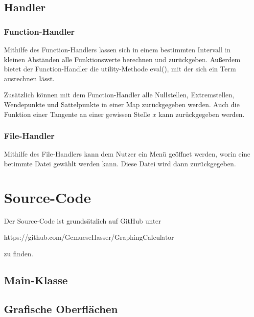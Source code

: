 \documentclass[12pt,a4paper]{article}
\newcommand{\project}{/home/jonas/Dokumente/Java-Projekte/GraphingCalculator/src/main/java/de/jonas/graphingcalculator}
\begin{document}
    \subsection{Handler}

    \subsubsection{Function-Handler}
    Mithilfe des Function-Handlers lassen sich in einem bestimmten Intervall in kleinen Abständen alle
    Funktionswerte berechnen und zurückgeben.
    Außerdem bietet der Function-Handler die utility-Methode eval(), mit der sich ein Term ausrechnen lässt.\par
    Zusätzlich können mit dem Function-Handler alle Nullstellen, Extremstellen, Wendepunkte und Sattelpunkte
    in einer Map zurückgegeben werden.
    Auch die Funktion einer Tangente an einer gewissen Stelle $x$ kann zurückgegeben werden.

    \subsubsection{File-Handler}
    Mithilfe des File-Handlers kann dem Nutzer ein Menü geöffnet werden, worin eine betimmte Datei gewählt werden kann.
    Diese Datei wird dann zurückgegeben.

    \newpage


    \section{Source-Code}
    Der Source-Code ist grundsätzlich auf GitHub unter\par
    https://github.com/GemueseHasser/GraphingCalculator\par
    zu finden.

    \vspace{1cm}

    \subsection{Main-Klasse}

    

    \newpage
    \subsection{Grafische Oberflächen}
\end{document}
